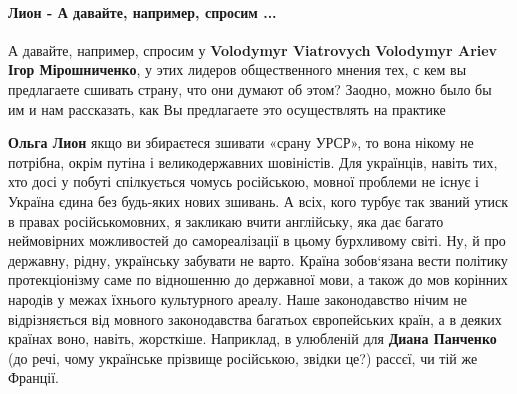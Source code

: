  
 
 
 
 

\paragraph{Лион - А давайте, например, спросим ...}
\label{sec:31_07_2021.fb.panchenko_diana.1.oko_za_oko.cmt.lion_a_davajte_sprosim}

\begin{itemize}


А давайте, например, спросим у \textbf{Volodymyr Viatrovych} \textbf{Volodymyr
Ariev} \textbf{Ігор Мірошниченко}, у этих лидеров общественного мнения тех, с
кем вы предлагаете сшивать страну, что они думают об этом? Заодно, можно было
бы им и нам рассказать, как Вы предлагаете это осуществлять на практике

\begin{itemize}
 

\textbf{Ольга Лион} якщо ви збираєтеся зшивати «срану УРСР», то вона нікому не
потрібна, окрім путіна і великодержавних шовіністів. Для українців, навіть тих,
хто досі у побуті спілкується чомусь російською, мовної проблеми не існує і
Україна єдина без будь-яких нових зшивань. А всіх, кого турбує так званий утиск
в правах російськомовних, я закликаю вчити англійську, яка дає багато
неймовірних можливостей до самореалізації в цьому бурхливому світі. Ну, й про
державну, рідну, українську забувати не варто. Країна зобов‘язана вести
політику протекціонізму саме по відношенню до державної мови, а також до мов
корінних народів у межах їхнього культурного ареалу. Наше законодавство нічим
не відрізняється від мовного законодавства багатьох європейських країн, а в
деяких країнах воно, навіть, жорсткіше. Наприклад, в улюбленій для \textbf{Диана
Панченко} (до речі, чому українське прізвище російською, звідки це?) рассєї, чи
тій же Франції.


\end{itemize}
\end{itemize}
